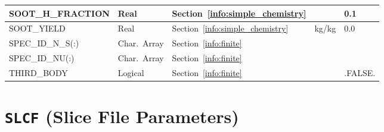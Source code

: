 \documentclass[11pt]{book}
\begin{document}
\begin{longtable}{@{\extracolsep{\fill}}|l|l|l|l|l|}
{\ct SOOT\_H\_FRACTION}                   & Real        & Section~\ref{info:simple_chemistry}       &                   & 0.1    \\ \hline
{\ct SOOT\_YIELD}                         & Real        & Section~\ref{info:simple_chemistry}       & kg/kg             & 0.0    \\ \hline
{\ct SPEC\_ID\_N\_S(:)}                   & Char.~Array & Section~\ref{info:finite}                   &                   &     \\ \hline
{\ct SPEC\_ID\_NU(:)}                     & Char.~Array & Section~\ref{info:finite}                   &                   &     \\ \hline
{\ct THIRD\_BODY}                         & Logical     & Section~\ref{info:finite}                 &                   & {\ct .FALSE.}    \\ \hline
\end{longtable}

\vspace{\baselineskip}


\section{\texorpdfstring{{\tt SLCF}}{SLCF} (Slice File Parameters)}
\end{document}
